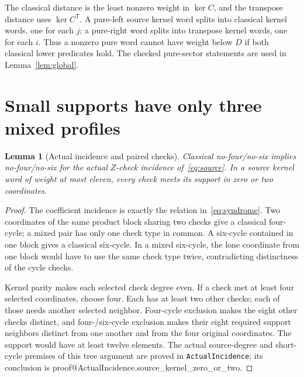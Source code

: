 \documentclass[11pt]{article}
\makeatletter
\newtheorem{lemma}[theorem]{Lemma}
\theoremstyle{definition}\newtheorem{definition}[theorem]{Definition}
\newcommand{\lean}[2]{\csname proof@#1.#2\endcsname}
\makeatother
\begin{document}
The classical distance is the least nonzero weight in $\ker C$, and the
transpose distance uses $\ker C^{\mathsf T}$. A pure-left source kernel word
splits into classical kernel words, one for each $j$; a pure-right word
splits into transpose kernel words, one for each $i$. Thus a nonzero pure
word cannot have weight below $D$ if both classical lower predicates hold.
The checked pure-sector statements are used in Lemma~\ref{lem:global}.

\section{Small supports have only three mixed profiles}\label{sec:geometry}
\begin{lemma}[Actual incidence and paired checks]\label{lem:incidence}
Classical no-four/no-six implies no-four/no-six for the actual $Z$-check
incidence of~\eqref{eq:source}. In a source kernel word of weight at most
eleven, every check meets its support in zero or two coordinates.
\end{lemma}
\begin{proof}
The coefficient incidence is exactly the relation in~\eqref{eq:syndrome}.
Two coordinates of the same product block sharing two checks give a classical
four-cycle; a mixed pair has only one check type in common. A six-cycle
contained in one block gives a classical six-cycle. In a mixed six-cycle,
the lone coordinate from one block would have to use the same check type
twice, contradicting distinctness of the cycle checks.

Kernel parity makes each selected check degree even. If a check met at least
four selected coordinates, choose four. Each has at least two other checks;
each of those needs another selected neighbor. Four-cycle exclusion makes
the eight other checks distinct, and four-/six-cycle exclusion makes their
eight required support neighbors distinct from one another and from the
four original coordinates. The support would have at least twelve elements.
The actual source-degree and short-cycle premises of this tree argument are
proved in \texttt{ActualIncidence}; its conclusion is
\lean{ActualIncidence}{source_kernel_zero_or_two}.
\end{proof}
\end{document}
